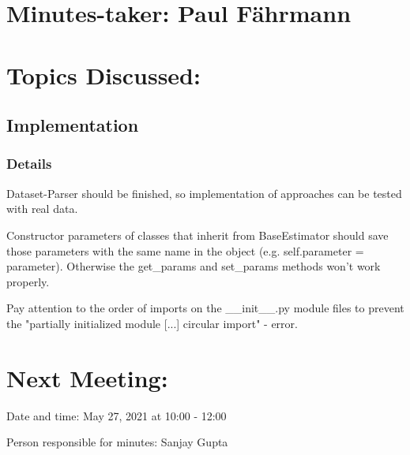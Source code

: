 \documentclass[11pt]{meetingmins} %
\begin{document}
\maketitle

\section{Minutes-taker: Paul Fährmann}

\section{Topics Discussed:}

\subsection{Implementation}
\subsubsection{Details}
\begin{hiddensubitems}
	\item Dataset-Parser should be finished, so implementation of approaches can be tested with real data.
	\item Constructor parameters of classes that inherit from BaseEstimator should save those parameters with the same name in the object (e.g. self.parameter = parameter). Otherwise the get\_params and set\_params methods won't work properly.
	\item Pay attention to the order of imports on the \_\_init\_\_.py module files to prevent the "partially initialized module [...] circular import" - error.
\end{hiddensubitems}

\section{Next Meeting:}
\begin{hiddensubitems}
	\item Date and time: May 27, 2021 at 10:00 - 12:00
	\item Person responsible for minutes: Sanjay Gupta
\end{hiddensubitems}
\end{document}
